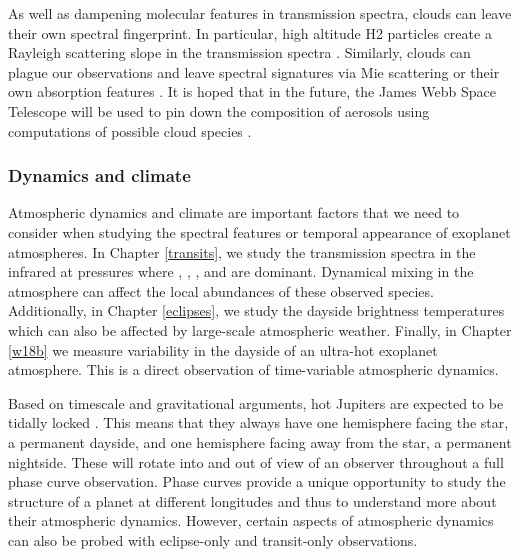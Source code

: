 
As well as dampening molecular features in transmission spectra, clouds can leave their own spectral fingerprint. In particular, high altitude H2 particles create a Rayleigh scattering slope in the transmission spectra
\citep[e.g.,][]{LecavelierdesEtangs2008,Sing2015, Sing2016, Gibson2017}. Similarly, clouds can plague our observations and leave spectral signatures via Mie scattering \citep[e.g.,][]{Benneke2019} or their own absorption features \citep[e.g.,][]{Wakeford2015}. It is hoped that in the future, the James Webb Space Telescope will be used to pin down the composition of aerosols using computations of possible cloud species \citep[e.g.,][]{Gao2020}.

\subsubsection{Dynamics and climate}

Atmospheric dynamics and climate are important factors that we need to consider when studying the spectral features or temporal appearance of exoplanet atmospheres. In Chapter \ref{transits}, we study the transmission spectra in the infrared at pressures where , , , and  are dominant. Dynamical mixing in the atmosphere can affect the local abundances of these observed species. Additionally, in Chapter \ref{eclipses}, we study the dayside brightness temperatures which can also be affected by large-scale atmospheric weather. Finally, in Chapter \ref{w18b} we measure variability in the dayside of an ultra-hot exoplanet atmosphere. This is a direct observation of time-variable atmospheric dynamics.

Based on timescale and gravitational arguments, hot Jupiters are expected to be tidally locked \citep[e.g.,][]{Rasio1996, Guillot1996}. This means that they always have one hemisphere facing the star, a permanent dayside, and one hemisphere facing away from the star, a permanent nightside. These will rotate into and out of view of an observer throughout a full phase curve observation. Phase curves provide a unique opportunity to study the structure of a planet at different longitudes and thus to understand more about their atmospheric dynamics. However, certain aspects of atmospheric dynamics can also be probed with eclipse-only and transit-only observations.

